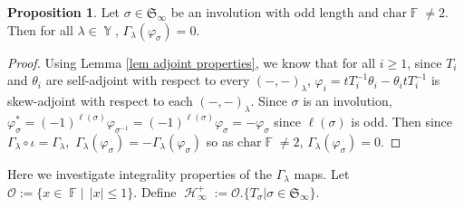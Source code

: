 \documentclass[12pt,reqno]{amsart}
\theoremstyle{definition}
\newtheorem{prop}[thm]{Proposition}
\DeclareMathOperator{\bF}{\mathbb{F}}
\DeclareMathOperator{\cH}{\mathcal{H}}
\DeclareMathOperator{\Par}{\mathbb{Y}}
\begin{document}
\begin{prop}
    Let $\sigma \in \mathfrak{S}_{\infty}$ be an involution with odd length and $\mathrm{char} \bF \neq 2$. Then for all $\lambda \in \Par$, $\Gamma_{\lambda}(\varphi_{\sigma}) = 0.$
\end{prop}
\begin{proof}
  Using Lemma \ref{lem adjoint properties}, we know that for all $i \geq 1$, since $T_i$ and $\theta_{i}$ are self-adjoint with respect to every $(-,-)_{\lambda}$, $\varphi_i = tT_{i}^{-1}\theta_i - \theta_i tT_{i}^{-1}$ is skew-adjoint with respect to each $(-,-)_{\lambda}.$ Since $\sigma$ is an involution, $
  \varphi_{\sigma}^* = (-1)^{\ell(\sigma)} \varphi_{\sigma^{-1}} = (-1)^{\ell(\sigma)} \varphi_{\sigma} = -\varphi_{\sigma}$ since $\ell(\sigma)$ is odd. Then since $\Gamma_{\lambda} \circ \iota = \Gamma_{\lambda},$ $\Gamma_{\lambda}(\varphi_{\sigma}) = -\Gamma_{\lambda}(\varphi_{\sigma})$ so as $\mathrm{char} \bF \neq 2$, $\Gamma_{\lambda}(\varphi_{\sigma}) = 0.$
\end{proof}

Here we investigate integrality properties of the $\Gamma_{\lambda}$ maps. Let $\mathcal{O}:= \{ x\in \bF |~~ |x| \leq 1 \}.$ Define $\cH_{\infty}^{+}:= \mathcal{O}.\{T_{\sigma} | \sigma \in \mathfrak{S}_{\infty}\}.$
\end{document}
